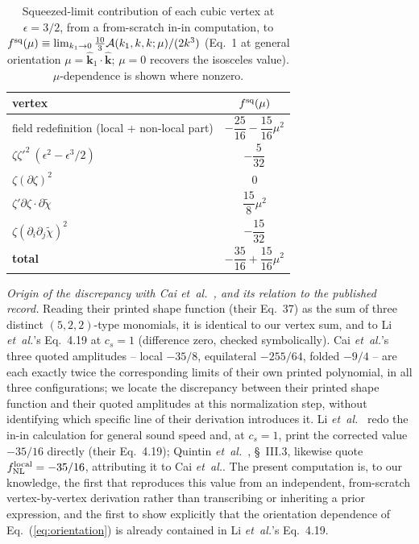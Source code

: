 \documentclass[aps,prd,reprint,superscriptaddress,showpacs,preprintnumbers,nofootinbib,longbibliography,floatfix]{revtex4-2}
\newcommand{\etal}{\textit{et~al.}}
\begin{document}
\begin{table}[t]
\caption{Squeezed-limit contribution of each cubic vertex at $\epsilon=3/2$, from a
from-scratch in-in computation, to $f^{\rm sq}(\mu)\equiv\lim_{k_1\to0}\tfrac{10}{3}
\mathcal A(k_1,k,k;\mu)/(2k^3)$ (Eq.~1 at general orientation $\mu=\hat{\mathbf
k}_1\!\cdot\!\hat{\mathbf k}$; $\mu=0$ recovers the isosceles value). $\mu$-dependence is
shown where nonzero.}
\label{tab:vertices}
\begin{ruledtabular}
\begin{tabular}{lc}
vertex & $f^{\rm sq}(\mu)$ \\
\hline
field redefinition (local + non-local part) & $-\dfrac{25}{16}-\dfrac{15}{16}\mu^2$ \\
$\zeta\zeta'^2\ (\epsilon^2-\epsilon^3/2)$ & $-\dfrac{5}{32}$ \\
$\zeta(\partial\zeta)^2$ & $0$ \\
$\zeta'\partial\zeta\!\cdot\!\partial\tilde\chi$ & $\dfrac{15}{8}\mu^2$ \\
$\zeta(\partial_i\partial_j\tilde\chi)^2$ & $-\dfrac{15}{32}$ \\
\hline
\textbf{total} & $-\dfrac{35}{16}+\dfrac{15}{16}\mu^2$ \\
\end{tabular}
\end{ruledtabular}
\end{table}

\textit{Origin of the discrepancy with Cai \etal~\cite{Cai:2009fn}, and its relation
to the published record.} Reading their printed shape function (their Eq.~37) as the sum
of three distinct $(5,2,2)$-type monomials, it is identical to our vertex sum, and to
Li \etal's Eq.~4.19 at $c_s=1$ (difference zero, checked symbolically). Cai \etal's three
quoted amplitudes -- local $-35/8$, equilateral $-255/64$, folded $-9/4$ -- are each
exactly twice the corresponding limits of their own printed polynomial, in all three
configurations; we locate the discrepancy between their printed shape function and their
quoted amplitudes at this normalization step, without identifying which specific line of
their derivation introduces it. Li \etal~\cite{Li:2016} redo the in-in calculation for
general sound speed and, at $c_s=1$, print the corrected value $-35/16$ directly (their
Eq.~4.19); Quintin \etal~\cite{Quintin:2015}, \S~III.3, likewise quote $f_{\rm NL}^{\rm
local}=-35/16$, attributing it to Cai \etal. The present computation is, to our knowledge,
the first that reproduces this value from an independent, from-scratch vertex-by-vertex
derivation rather than transcribing or inheriting a prior expression, and the first to
show explicitly that the orientation dependence of Eq.~(\ref{eq:orientation}) is already
contained in Li \etal's Eq.~4.19.
\end{document}
